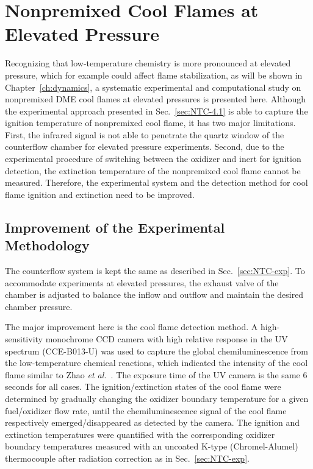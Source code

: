 \section{Nonpremixed Cool Flames at Elevated Pressure}

Recognizing that low-temperature chemistry is more pronounced at elevated pressure, which for example could affect flame stabilization, as will be shown in Chapter~\ref{ch:dynamics}, a systematic experimental and computational study on nonpremixed DME cool flames at elevated pressures is presented here.  Although the experimental approach presented in Sec.~\ref{sec:NTC-4.1} is able to capture the ignition temperature of nonpremixed cool flame, it has two major limitations.  First, the infrared signal is not able to penetrate the quartz window of the counterflow chamber for elevated pressure experiments.  Second, due to the experimental procedure of switching between the oxidizer and inert for ignition detection, the extinction temperature of the nonpremixed cool flame cannot be measured.  Therefore, the experimental system and the detection method for cool flame ignition and extinction need to be improved.

\subsection{Improvement of the Experimental Methodology}

The counterflow system is kept the same as described in Sec.~\ref{sec:NTC-exp}.  To accommodate experiments at elevated pressures, the exhaust valve of the chamber is adjusted to balance the inflow and outflow and maintain the desired chamber pressure.

The major improvement here is the cool flame detection method.  A high-sensitivity monochrome CCD camera with high relative response in the UV spectrum (CCE-B013-U) was used to capture the global chemiluminescence from the low-temperature chemical reactions, which indicated the intensity of the cool flame similar to Zhao \emph{et al.}~\cite{zhao16}.  The exposure time of the UV camera is the same 6 seconds for all cases.  The ignition/extinction states of the cool flame were determined by gradually changing the oxidizer boundary temperature for a given fuel/oxidizer flow rate, until the chemiluminescence signal of the cool flame respectively emerged/disappeared as detected by the camera.  The ignition and extinction temperatures were quantified with the corresponding oxidizer boundary temperatures measured with an uncoated K-type (Chromel-Alumel) thermocouple after radiation correction as in Sec.~\ref{sec:NTC-exp}.

